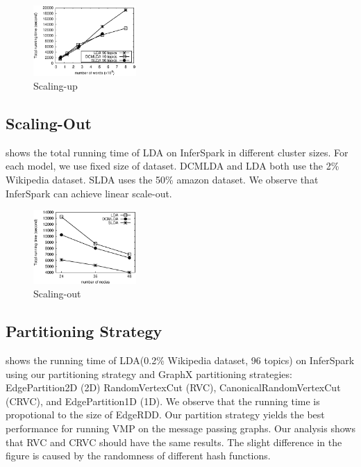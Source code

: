 \begin{figure}[h]\centering
	\includegraphics[width=0.35\textwidth]{figs/exp_lda_datasize.eps}
	\caption{Scaling-up}
	\label{fig:scale-up}
\end{figure}



\subsection{Scaling-Out}

 shows the total running time of LDA on InferSpark in
different cluster sizes. For each model, we use fixed size of dataset.  DCMLDA
and LDA both use the 2\% Wikipedia dataset. SLDA uses the 50\% amazon dataset.
We observe that InferSpark can achieve linear scale-out. 

\begin{figure}[h]
	\centering
	\includegraphics[width=0.35\textwidth]{figs/exp_clustersize.eps}
	\caption{Scaling-out}
	\label{fig:scale-out}
\end{figure}


\subsection{Partitioning Strategy}

 shows the running time of LDA(0.2\% Wikipedia dataset, 96 topics) on InferSpark
using our partitioning strategy  and 
GraphX partitioning strategies: 
EdgePartition2D  (2D)
RandomVertexCut (RVC),
CanonicalRandomVertexCut (CRVC), and
EdgePartition1D (1D).
We observe that the running time is propotional to the size of EdgeRDD.
Our partition strategy yields the best performance for running VMP on the
message passing graphs.  Our analysis shows that RVC and CRVC should have the
same results. The slight difference in the figure is caused by the randomness
of different hash functions.


